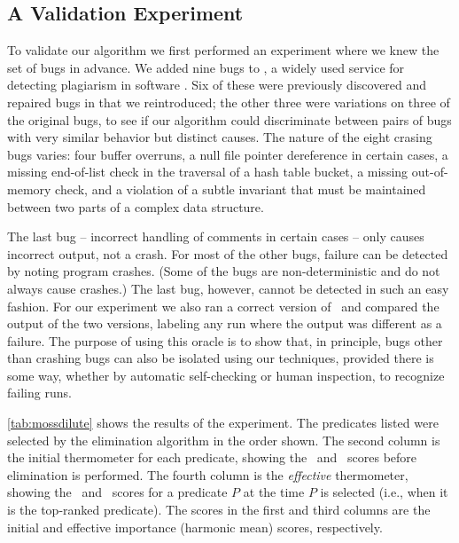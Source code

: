 \subsection{A Validation Experiment}

To validate our algorithm we first performed an experiment where we
knew the set of bugs in advance.  We added nine bugs to \moss, a
widely used service for detecting plagiarism in software
\cite{Schleimer:2003:WLA}.  Six of these were previously discovered
and repaired bugs in \moss that we reintroduced; the other three were
variations on three of the original bugs, to see if our algorithm could
discriminate between pairs of bugs with very similar behavior but
distinct causes.  The nature of the eight crasing bugs varies: four
buffer overruns, a null file pointer dereference in certain cases, a
missing end-of-list check in the traversal of a hash table bucket, a missing
out-of-memory check, and a violation of a subtle invariant that must be maintained between two
parts of a complex data structure.  

The last bug -- incorrect handling of comments in certain cases -- only
causes incorrect output, not a crash.  For most of the other bugs, failure can 
be detected by noting program crashes.  (Some of the bugs are non-deterministic 
and do not always cause crashes.)  The last bug, however, cannot be detected 
in such an easy fashion.
For our experiment we also ran a correct version of \moss\ and
compared the output of the two versions, labeling any run where the
output was different as a failure.  The purpose of using this oracle
is to show that, in principle, bugs other than crashing bugs can also
be isolated using our techniques, provided there is some way, whether
by automatic self-checking or human inspection, to recognize failing
runs.



\autoref{tab:mossdilute} shows the results of the experiment.  The
predicates listed were selected by the elimination algorithm in the
order shown.  The second column is the initial thermometer for each
predicate,  showing the \context\ and \increase\ scores before
elimination is performed. The fourth column is the {\em effective}
thermometer, showing the \context\ and \increase\ scores for a
predicate $P$ at the time $P$ is selected (i.e., when it is the
top-ranked predicate).  The scores in the first and third columns are
the initial and effective importance (harmonic mean) scores, respectively.


